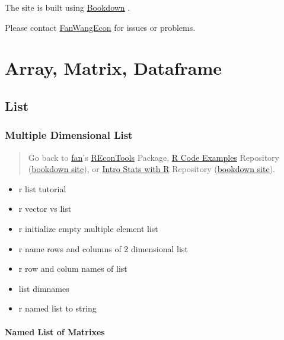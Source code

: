 \documentclass[
]{book}
\providecommand{\tightlist}{%
  \setlength{\itemsep}{0pt}\setlength{\parskip}{0pt}}
\begin{document}
The site is built using \href{https://bookdown.org/}{Bookdown} \citep{R-bookdown}.

Please contact \href{https://fanwangecon.github.io/}{FanWangEcon} for issues or problems.

\hypertarget{array-matrix-dataframe}{%
\chapter{Array, Matrix, Dataframe}\label{array-matrix-dataframe}}

\hypertarget{list}{%
\section{List}\label{list}}

\hypertarget{multiple-dimensional-list}{%
\subsection{Multiple Dimensional List}\label{multiple-dimensional-list}}

\begin{quote}
Go back to \href{http://fanwangecon.github.io/}{fan}'s \href{https://fanwangecon.github.io/REconTools/}{REconTools} Package, \href{https://fanwangecon.github.io/R4Econ/}{R Code Examples} Repository (\href{https://fanwangecon.github.io/R4Econ/bookdown}{bookdown site}), or \href{https://fanwangecon.github.io/Stat4Econ/}{Intro Stats with R} Repository (\href{https://fanwangecon.github.io/Stat4Econ/bookdown}{bookdown site}).
\end{quote}

\begin{itemize}
\tightlist
\item
  r list tutorial
\item
  r vector vs list
\item
  r initialize empty multiple element list
\item
  r name rows and columns of 2 dimensional list
\item
  r row and colum names of list
\item
  list dimnames
\item
  r named list to string
\end{itemize}

\hypertarget{named-list-of-matrixes}{%
\subsubsection{Named List of Matrixes}\label{named-list-of-matrixes}}
\end{document}
